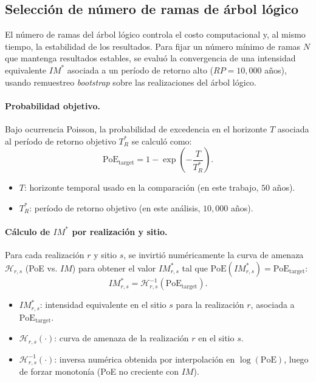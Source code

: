 \subsection{Selección de número de ramas de árbol lógico}
\label{sec:meto_nlt}

El número de ramas del árbol lógico controla el costo computacional y, al mismo tiempo, la estabilidad de los resultados. Para fijar un número mínimo de ramas $N$ que mantenga resultados estables, se evaluó la convergencia de una intensidad equivalente $IM^\ast$ asociada a un período de retorno alto ($RP=10{,}000$ años), usando remuestreo \textit{bootstrap} sobre las realizaciones del árbol lógico.

\paragraph{Probabilidad objetivo.}
Bajo ocurrencia Poisson, la probabilidad de excedencia en el horizonte $T$ asociada al período de retorno objetivo $T_R^\ast$ se calculó como:
\begin{equation}
\mathrm{PoE}_{\mathrm{target}}=1-\exp\!\left(-\frac{T}{T_R^\ast}\right).
\end{equation}
\begin{itemize}
  \item $T$: horizonte temporal usado en la comparación (en este trabajo, $50$ años).
  \item $T_R^\ast$: período de retorno objetivo (en este análisis, $10{,}000$ años).
\end{itemize}

\paragraph{Cálculo de $IM^\ast$ por realización y sitio.}
Para cada realización $r$ y sitio $s$, se invirtió numéricamente la curva de amenaza $\mathcal{H}_{r,s}$ (PoE vs. $IM$) para obtener el valor $IM^\ast_{r,s}$ tal que $\mathrm{PoE}(IM^\ast_{r,s})=\mathrm{PoE}_{\mathrm{target}}$:
\begin{equation}
IM^\ast_{r,s}=\mathcal{H}^{-1}_{r,s}\!\left(\mathrm{PoE}_{\mathrm{target}}\right).
\end{equation}
\begin{itemize}
  \item $IM^\ast_{r,s}$: intensidad equivalente en el sitio $s$ para la realización $r$, asociada a $\mathrm{PoE}_{\mathrm{target}}$.
  \item $\mathcal{H}_{r,s}(\cdot)$: curva de amenaza de la realización $r$ en el sitio $s$.
  \item $\mathcal{H}^{-1}_{r,s}(\cdot)$: inversa numérica obtenida por interpolación en $\log(\mathrm{PoE})$, luego de forzar monotonía (PoE no creciente con $IM$).
\end{itemize}

